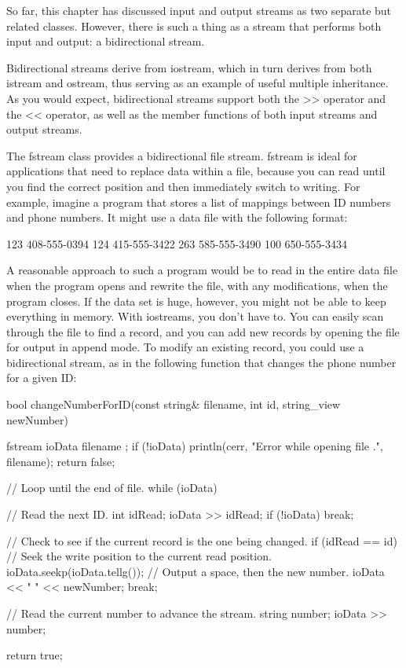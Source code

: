 So far, this chapter has discussed input and output streams as two separate but related classes. However, there is such a thing as a stream that performs both input and output: a bidirectional stream.

Bidirectional streams derive from iostream, which in turn derives from both istream and ostream, thus serving as an example of useful multiple inheritance. As you would expect, bidirectional streams support both the >{}> operator and the <{}< operator, as well as the member functions of both input streams and output streams.

The fstream class provides a bidirectional file stream. fstream is ideal for applications that need to replace data within a file, because you can read until you find the correct position and then immediately switch to writing. For example, imagine a program that stores a list of mappings between ID numbers and phone numbers. It might use a data file with the following format:

\begin{shell}
123 408-555-0394
124 415-555-3422
263 585-555-3490
100 650-555-3434
\end{shell}

A reasonable approach to such a program would be to read in the entire data file when the program opens and rewrite the file, with any modifications, when the program closes. If the data set is huge, however, you might not be able to keep everything in memory. With iostreams, you don’t have to. You can easily scan through the file to find a record, and you can add new records by opening the file for output in append mode. To modify an existing record, you could use a bidirectional stream, as in the following function that changes the phone number for a given ID:


\begin{shell}
bool changeNumberForID(const string& filename, int id, string_view newNumber)
{
    fstream ioData { filename };
    if (!ioData) {
        println(cerr, "Error while opening file {}.", filename);
        return false;
    }

    // Loop until the end of file.
    while (ioData) {
        // Read the next ID.
        int idRead;
        ioData >> idRead;
        if (!ioData) { break; }

        // Check to see if the current record is the one being changed.
        if (idRead == id) {
            // Seek the write position to the current read position.
            ioData.seekp(ioData.tellg());
            // Output a space, then the new number.
            ioData << " " << newNumber;
            break;
        }

        // Read the current number to advance the stream.
        string number;
        ioData >> number;
    }
    return true;
}
\end{shell}

